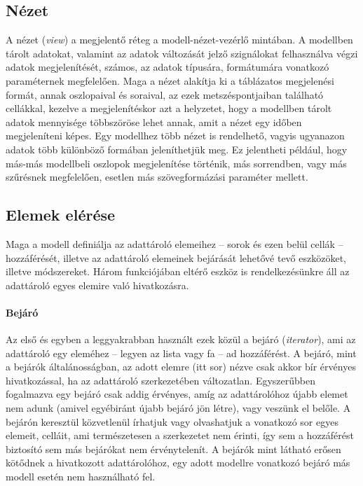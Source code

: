 \subsection{Nézet}

A nézet (\textit{view}) a megjelentő réteg a modell-nézet-vezérlő mintában. A modellben tárolt adatokat, valamint az adatok változását jelző szignálokat felhasználva végzi adatok megjelenítését, számos, az adatok típusára, formátumára vonatkozó paraméternek megfelelően. Maga a nézet alakítja ki a táblázatos megjelenési formát, annak oszlopaival és soraival, az ezek metszéspontjaiban található cellákkal, kezelve a megjelenítéskor azt a helyzetet, hogy a modellben tárolt adatok mennyisége többszöröse lehet annak, amit a nézet egy időben megjeleníteni képes. Egy modellhez több nézet is rendelhető, vagyis ugyanazon adatok több különböző formában jeleníthetjük meg. Ez jelentheti például, hogy más-más modellbeli oszlopok megjelenítése történik, más sorrendben, vagy más szűrésnek megfelelően, esetlen más szövegformázási paraméter mellett.

\subsection{Elemek elérése}

Maga a modell definiálja az adattároló elemeihez -- sorok és ezen belül cellák -- hozzáférését, illetve az adattároló elemeinek bejárását lehetővé tevő eszközöket, illetve módszereket. Három funkciójában eltérő eszköz is rendelkezésünkre áll az adattároló egyes elemire való hivatkozásra. 

\paragraph{Bejáró}

Az első és egyben a leggyakrabban használt ezek közül a bejáró (\textit{iterator}), ami az adattároló egy eleméhez -- legyen az lista vagy fa -- ad hozzáférést. A bejáró, mint a bejárók általánosságban, az adott elemre (itt sor) nézve csak akkor bír érvényes hivatkozással, ha az adattároló szerkezetében változatlan. Egyszerűbben fogalmazva egy bejáró csak addig érvényes, amíg az adattárolóhoz újabb elemet nem adunk (amivel egyébiránt újabb bejáró jön létre), vagy veszünk el belőle. A bejárón keresztül közvetlenül írhatjuk vagy olvashatjuk a vonatkozó sor egyes elemeit, celláit, ami természetesen a szerkezetet nem érinti, így sem a hozzáférést biztosító sem más bejárókat nem érvénytelenít. A bejárók mint látható erősen kötődnek a hivatkozott adattárolóhoz, egy adott modellre vonatkozó bejáró más modell esetén nem használható fel.

